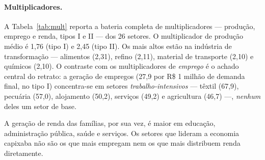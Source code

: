 \documentclass[11pt,a4paper]{article}
\begin{document}
\paragraph{Multiplicadores.}
A Tabela~\ref{tab:mult} reporta a bateria completa de multiplicadores --- produção,
emprego e renda, tipos I e II --- dos 26 setores. O multiplicador de produção médio é
1,76 (tipo I) e 2,45 (tipo II). Os mais altos estão na indústria de transformação ---
alimentos (2,31), refino (2,11), material de transporte (2,10) e químicos (2,10). O
contraste com os multiplicadores de \emph{emprego} é o achado central do retrato: a
geração de empregos (27,9 por R\$ 1 milhão de demanda final, no tipo I) concentra-se em setores \emph{trabalho-intensivos} --- têxtil (67,9), pecuária (57,0), alojamento (50,2),
serviços (49,2) e agricultura (46,7) ---, \emph{nenhum} deles um setor de base.

A geração de renda das famílias, por sua vez, é maior em educação, administração
pública, saúde e serviços. Os setores que lideram a economia capixaba não são os que mais empregam nem os que mais distribuem renda diretamente.

\begin{table}[tbp]
\centering\footnotesize

\caption{Multiplicadores de produção, emprego e renda dos 26 setores do ES (2008),
tipos I e II, ordenados pelo multiplicador de produção de tipo I. Emprego em empregos
por R\$\,1 milhão de demanda final; renda em R\$ por R\$\,1 de demanda final. Fonte:
\texttt{27\_tab\_multiplicadores.py} sobre \texttt{outputs/es\_caracterizacao\_2008.csv}.}
\label{tab:mult}
\end{table}
\end{document}
